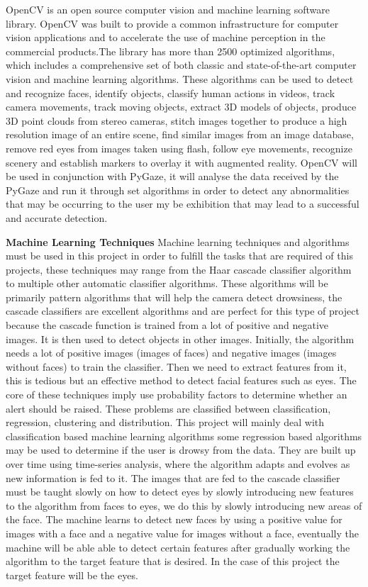 OpenCV is an open source computer vision and machine learning software library. OpenCV was built to provide a common infrastructure for computer vision applications and to accelerate the use of machine perception in the commercial products.The library has more than 2500 optimized algorithms, which includes a comprehensive set of both classic and state-of-the-art computer vision and machine learning algorithms. These algorithms can be used to detect and recognize faces, identify objects, classify human actions in videos, track camera movements, track moving objects, extract 3D models of objects, produce 3D point clouds from stereo cameras, stitch images together to produce a high resolution image of an entire scene, find similar images from an image database, remove red eyes from images taken using flash, follow eye movements, recognize scenery and establish markers to overlay it with augmented reality. OpenCV will be used in conjunction with PyGaze, it will analyse the data received by the PyGaze and run it through set algorithms in order to detect any abnormalities that may be occurring to the user my be exhibition that may lead to a successful and accurate detection.

\textbf{Machine Learning Techniques}
Machine learning techniques and algorithms must be used in this project in order to fulfill the tasks that are required of this projects, these techniques may range from the Haar cascade classifier algorithm to multiple other automatic classifier algorithms. These algorithms will be primarily pattern algorithms that will help the camera detect drowsiness, the cascade classifiers are excellent algorithms and are perfect for this type of project because the cascade function is trained from a lot of positive and negative images. It is then used to detect objects in other images. Initially, the algorithm needs a lot of positive images (images of faces) and negative images (images without faces) to train the classifier. Then we need to extract features from it, this is tedious but an effective method to detect facial features such as eyes. The core of these techniques imply use probability factors to determine whether an alert should be raised.  These problems are  classified  between  classification,  regression,  clustering  and  distribution. This project will mainly deal with classification based machine learning algorithms some regression based algorithms may be used to determine if the user is drowsy from the data. They are built up over time using time-series analysis, where the algorithm adapts and evolves as new information is fed to it. The images that are fed to the cascade classifier must be taught slowly on how to detect eyes by slowly introducing new features to the algorithm from faces to eyes, we do this by slowly introducing new areas of the face. The machine learns to detect new faces by using a positive value for images with a face and a negative value for images without a face, eventually the machine will be able able to detect certain features after gradually working the algorithm to the target feature that is desired. In the case of this project the target feature will be the eyes.

